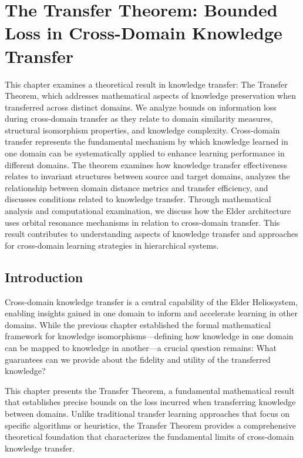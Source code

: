 \chapter{The Transfer Theorem: Bounded Loss in Cross-Domain Knowledge Transfer}

\begin{tcolorbox}[colback=PureBlue!5!white,colframe=PureBlue!75!black,title=Chapter Summary]
This chapter examines a theoretical result in knowledge transfer: The Transfer Theorem, which addresses mathematical aspects of knowledge preservation when transferred across distinct domains. We analyze bounds on information loss during cross-domain transfer as they relate to domain similarity measures, structural isomorphism properties, and knowledge complexity. Cross-domain transfer represents the fundamental mechanism by which knowledge learned in one domain can be systematically applied to enhance learning performance in different domains. The theorem examines how knowledge transfer effectiveness relates to invariant structures between source and target domains, analyzes the relationship between domain distance metrics and transfer efficiency, and discusses conditions related to knowledge transfer. Through mathematical analysis and computational examination, we discuss how the Elder architecture uses orbital resonance mechanisms in relation to cross-domain transfer. This result contributes to understanding aspects of knowledge transfer and approaches for cross-domain learning strategies in hierarchical systems.
\end{tcolorbox}

\section{Introduction}

Cross-domain knowledge transfer is a central capability of the Elder Heliosystem, enabling insights gained in one domain to inform and accelerate learning in other domains. While the previous chapter established the formal mathematical framework for knowledge isomorphisms—defining how knowledge in one domain can be mapped to knowledge in another—a crucial question remains: What guarantees can we provide about the fidelity and utility of the transferred knowledge?

This chapter presents the Transfer Theorem, a fundamental mathematical result that establishes precise bounds on the loss incurred when transferring knowledge between domains. Unlike traditional transfer learning approaches that focus on specific algorithms or heuristics, the Transfer Theorem provides a comprehensive theoretical foundation that characterizes the fundamental limits of cross-domain knowledge transfer.

